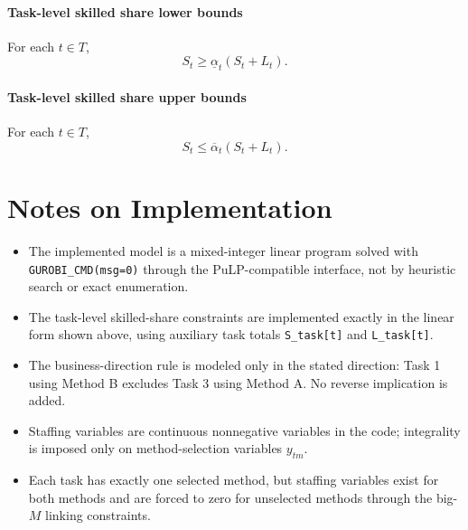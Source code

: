 \paragraph{Task-level skilled share lower bounds}
For each $t\in T$,
\[
S_t \ge \underline \alpha_t (S_t + L_t).
\]

\paragraph{Task-level skilled share upper bounds}
For each $t\in T$,
\[
S_t \le \overline \alpha_t (S_t + L_t).
\]

\section*{Notes on Implementation}

\begin{itemize}
    \item The implemented model is a mixed-integer linear program solved with \texttt{GUROBI\_CMD(msg=0)} through the PuLP-compatible interface, not by heuristic search or exact enumeration.
    \item The task-level skilled-share constraints are implemented exactly in the linear form shown above, using auxiliary task totals \texttt{S\_task[t]} and \texttt{L\_task[t]}.
    \item The business-direction rule is modeled only in the stated direction: Task 1 using Method B excludes Task 3 using Method A. No reverse implication is added.
    \item Staffing variables are continuous nonnegative variables in the code; integrality is imposed only on method-selection variables $y_{tm}$.
    \item Each task has exactly one selected method, but staffing variables exist for both methods and are forced to zero for unselected methods through the big-$M$ linking constraints.
\end{itemize}
